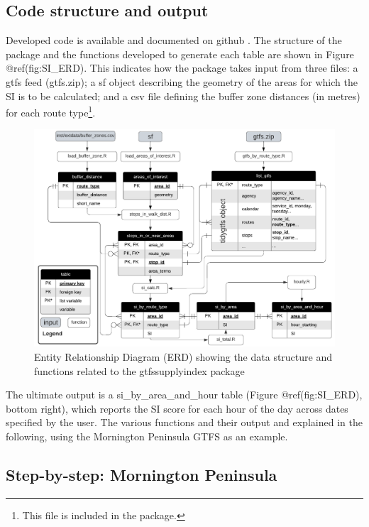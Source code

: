 \documentclass[preprint, 3p,
authoryear]{elsarticle} %
\begin{document}
\hypertarget{code-structure-and-output}{%
\subsection{Code structure and output}\label{code-structure-and-output}}

Developed code is available and documented on github
\citep{gtfssupplyindex_github}. The structure of the package and the
functions developed to generate each table are shown in Figure
@ref(fig:SI\_ERD). This indicates how the package takes input from three
files: a gtfs feed (gtfs.zip); a sf object describing the geometry of
the areas for which the SI is to be calculated; and a csv file defining
the buffer zone distances (in metres) for each route type\footnote{This
  file is included in the package.}.

\begin{figure}
\includegraphics[width=1\linewidth]{graphics/SI_data_structure} \caption{Entity Relationship Diagram (ERD) showing the data structure and functions related to the gtfssupplyindex package}\label{fig:SI_ERD}
\end{figure}

The ultimate output is a si\_by\_area\_and\_hour table (Figure
@ref(fig:SI\_ERD), bottom right), which reports the SI score for each
hour of the day across dates specified by the user. The various
functions and their output and explained in the following, using the
Mornington Peninsula GTFS as an example.

\hypertarget{step-by-step-mornington-peninsula}{%
\subsection{Step-by-step: Mornington
Peninsula}\label{step-by-step-mornington-peninsula}}
\end{document}
